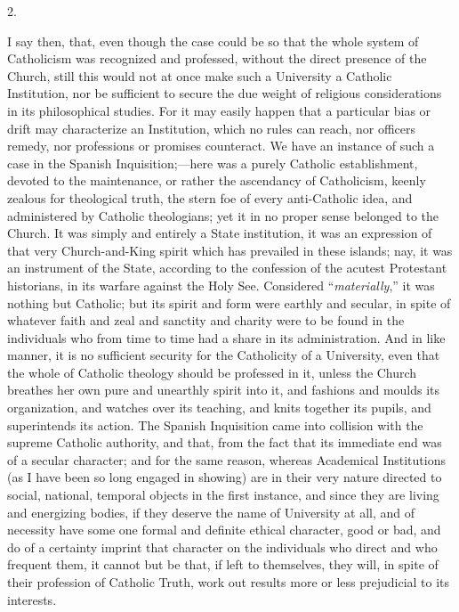 2.

I say then, that, even though the case could be so that the whole
system of Catholicism was recognized and professed, without the direct
presence of the Church, still this would not at once make such a
University a Catholic Institution, nor be sufficient to secure the due
weight of religious considerations in its philosophical studies. For
it may easily happen that a particular bias or drift may characterize
an Institution, which no rules can reach, nor officers remedy, nor
professions or promises counteract. We have an instance of such a case
in the Spanish Inquisition;—here was a purely Catholic
establishment, devoted to the maintenance, or rather the ascendancy of
Catholicism, keenly zealous for theological truth, the stern foe of
every anti-Catholic idea, and administered by Catholic theologians;
yet it in no proper sense belonged to the Church. It was simply and
entirely a State institution, it was an expression of that very
Church-and-King spirit which has prevailed in these islands; nay, it
was an instrument of the State, according to the confession of
the acutest Protestant historians, in its warfare against the Holy
See. Considered ``\emph{materially},'' it was nothing but
Catholic; but its spirit and form were earthly and secular, in spite
of whatever faith and zeal and sanctity and charity were to be found
in the individuals who from time to time had a share in its
administration. And in like manner, it is no sufficient security for
the Catholicity of a University, even that the whole of Catholic
theology should be professed in it, unless the Church breathes her own
pure and unearthly spirit into it, and fashions and moulds its
organization, and watches over its teaching, and knits together its
pupils, and superintends its action. The Spanish Inquisition came into
collision with the supreme Catholic authority, and that, from the fact
that its immediate end was of a secular character; and for the same
reason, whereas Academical Institutions (as I have been so long
engaged in showing) are in their very nature directed to social,
national, temporal objects in the first instance, and since they are
living and energizing bodies, if they deserve the name of University
at all, and of necessity have some one formal and definite ethical
character, good or bad, and do of a certainty imprint that character
on the individuals who direct and who frequent them, it cannot but be
that, if left to themselves, they will, in spite of their profession
of Catholic Truth, work out results more or less prejudicial to its
interests.

